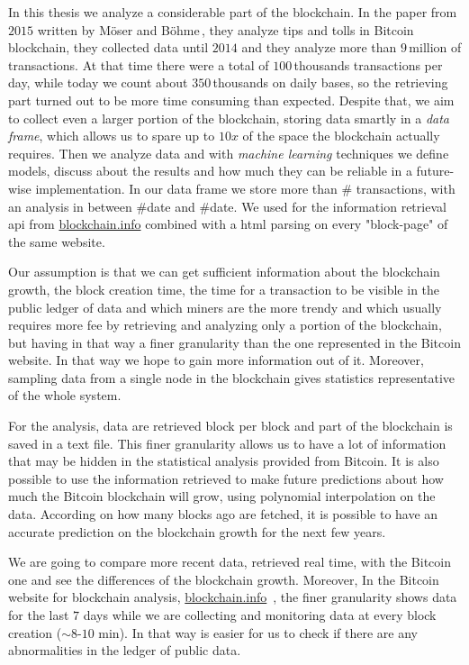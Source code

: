 \documentclass[USenglish]{uit-thesis}
\begin{document}
In this thesis we analyze a considerable part of the blockchain.
In the paper from $2015$ written by Möser and Böhme\,\cite{Moser2015},
they analyze tips and tolls in Bitcoin blockchain, they collected data until $2014$
and they analyze more than $9$\,million of transactions.
At that time there were a total of $100$\,thousands
transactions per day, while today we count about $350$\,thousands
on daily bases, so the retrieving part turned
out to be more time consuming than expected.
Despite that, we aim to collect even
a larger portion of the blockchain, storing data smartly in a
\emph{data frame}, which allows us to spare
up to $10x$ of the space the blockchain actually requires. Then we analyze data
and with \emph{machine learning} techniques we define models, discuss about
the results and how much they can be reliable in a future-wise implementation.
In our data frame we store more than \# transactions, with an analysis in between
\#date and \#date.
We used for the information retrieval \gls{api} from \url{blockchain.info}
combined with a \gls{html} parsing on every "block-page"
of the same website.

Our assumption is that we can get sufficient information about the
blockchain growth, the block creation time, the time for a transaction to be visible
in the public ledger of data and which miners are the more trendy and
which usually requires more fee by retrieving and analyzing only a portion
of the blockchain, but having in that way a finer
granularity than the one represented in the Bitcoin website. In that
way we hope to gain more information out of it.
Moreover, sampling data from a single node in the blockchain gives statistics
representative of the whole system.

For the analysis, data are retrieved block per block and part of the blockchain
is saved in a text file. This finer granularity allows us to have
a lot of information that may be hidden in the statistical analysis
provided from Bitcoin. It is also possible to use the information retrieved
to make future predictions about how much the 
Bitcoin blockchain will grow, using polynomial interpolation on the data. According
on how many blocks ago are fetched, it is possible to have an accurate prediction
on the blockchain growth for the next few years.

We are going to compare more recent data, retrieved
real time, with the Bitcoin one and see the differences of the
blockchain growth. Moreover, In the Bitcoin website for blockchain analysis,
\url{blockchain.info}~\cite{bitcoin_blockchain}, the finer granularity
shows data for the last $7$ days while we are collecting and monitoring data
at every block creation ($\sim8$-$10$ min). In that way is easier for us to check
if there are any abnormalities in the ledger of public data.
\end{document}
